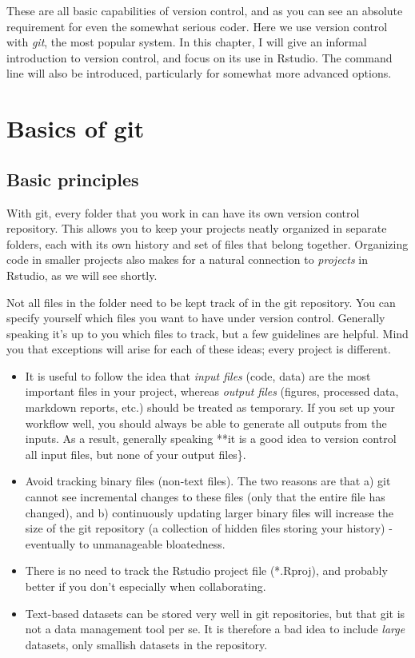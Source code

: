 \documentclass[]{book}
\providecommand{\tightlist}{%
  \setlength{\itemsep}{0pt}\setlength{\parskip}{0pt}}
\begin{document}
These are all basic capabilities of version control, and as you can see an absolute requirement for even the somewhat serious coder. Here we use version control with \emph{git}, the most popular system. In this chapter, I will give an informal introduction to version control, and focus on its use in Rstudio. The command line will also be introduced, particularly for somewhat more advanced options.

\hypertarget{basics-of-git}{%
\section{Basics of git}\label{basics-of-git}}

\hypertarget{basic-principles}{%
\subsection{Basic principles}\label{basic-principles}}

With git, every folder that you work in can have its own version control repository. This allows you to keep your projects neatly organized in separate folders, each with its own history and set of files that belong together. Organizing code in smaller projects also makes for a natural connection to \emph{projects} in Rstudio, as we will see shortly.

Not all files in the folder need to be kept track of in the git repository. You can specify yourself which files you want to have under version control. Generally speaking it's up to you which files to track, but a few guidelines are helpful. Mind you that exceptions will arise for each of these ideas; every project is different.

\begin{itemize}
\tightlist
\item
  It is useful to follow the idea that \emph{input files} (code, data) are the most important files in your project, whereas \emph{output files} (figures, processed data, markdown reports, etc.) should be treated as temporary. If you set up your workflow well, you should always be able to generate all outputs from the inputs. As a result, generally speaking **it is a good idea to version control all input files, but none of your output files\}.
\item
  Avoid tracking binary files (non-text files). The two reasons are that a) git cannot see incremental changes to these files (only that the entire file has changed), and b) continuously updating larger binary files will increase the size of the git repository (a collection of hidden files storing your history) - eventually to unmanageable bloatedness.
\item
  There is no need to track the Rstudio project file (*.Rproj), and probably better if you don't especially when collaborating.
\item
  Text-based datasets can be stored very well in git repositories, but that git is not a data management tool per se. It is therefore a bad idea to include \emph{large} datasets, only smallish datasets in the repository.
\end{itemize}
\end{document}
